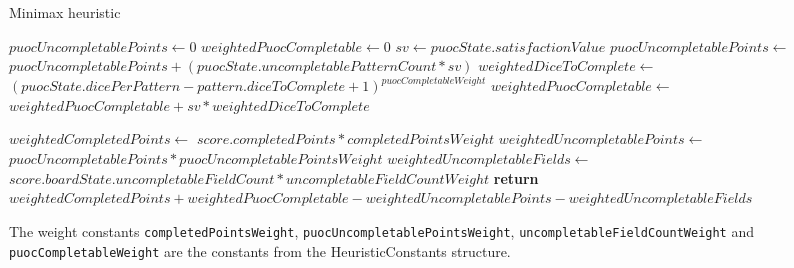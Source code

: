 \begin{algorithm}[H]
    \caption{Minimax heuristic}
    \begin{algorithmic}[1]
        \State $puocUncompletablePoints \gets 0 $
        \State $weightedPuocCompletable \gets 0 $
            \State $sv \gets puocState.satisfactionValue $
            \State $puocUncompletablePoints \gets $
            \State \hspace{\algorithmicindent}$puocUncompletablePoints + (puocState.uncompletablePatternCount * sv)$
                \State $weightedDiceToComplete \gets $
                \State \hspace{\algorithmicindent}$(puocState.dicePerPattern - pattern.diceToComplete + 1)^{puocCompletableWeight} $
                \State $weightedPuocCompletable \gets $
                \State \hspace{\algorithmicindent}$weightedPuocCompletable + sv * weightedDiceToComplete$
            \EndFor
        \EndFor

        \State $weightedCompletedPoints \gets  $
        \State \hspace{\algorithmicindent}$score.completedPoints * completedPointsWeight$
        \State $weightedUncompletablePoints \gets $
        \State \hspace{\algorithmicindent}$puocUncompletablePoints * puocUncompletablePointsWeight $
        \State $weightedUncompletableFields \gets   $
        \State \hspace{\algorithmicindent}$score.boardState.uncompletableFieldCount * uncompletableFieldCountWeight$
        \State \textbf{return} $weightedCompletedPoints + weightedPuocCompletable - weightedUncompletablePoints - weightedUncompletableFields$
    \EndFunction
    \end{algorithmic}
\end{algorithm}

The weight constants \texttt{completedPointsWeight}, \texttt{puocUncompletablePointsWeight}, \texttt{uncompletableFieldCountWeight} and \texttt{puocCompletableWeight}
are the constants from the HeuristicConstants structure.
